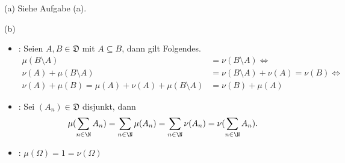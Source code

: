 \begin{solution}

(a) Siehe Aufgabe (a).

(b)

\begin{itemize}

  \item {}: Seien $A, B \in \mathfrak{D}$ mit $A \subseteq B$, dann gilt Folgendes.
  \begin{align*}
    \mu(B \setminus A)
    & =
    \nu(B \setminus A)
    \Leftrightarrow \\
    \nu(A) + \mu(B \setminus A)
    & =
    \nu(B \setminus A) + \nu(A)
    =
    \nu(B)
    \Leftrightarrow \\
    \nu(A) + \mu(B)
    =
    \mu(A) + \nu(A) + \mu(B \setminus A)
    & =
    \nu(B) + \mu(A)
  \end{align*}

  \item {}: Sei $(A_n) \in \mathfrak{D}$ disjunkt, dann
  \begin{align*}
    \mu(\sum_{n \in \N} A_n)
    =
    \sum_{n \in \N} \mu(A_n)
    =
    \sum_{n \in \N} \nu(A_n)
    =
    \nu(\sum_{n \in \N} A_n).
  \end{align*}

  \item {}: $\mu(\Omega) = 1 = \nu(\Omega)$

\end{itemize}

\end{solution}
